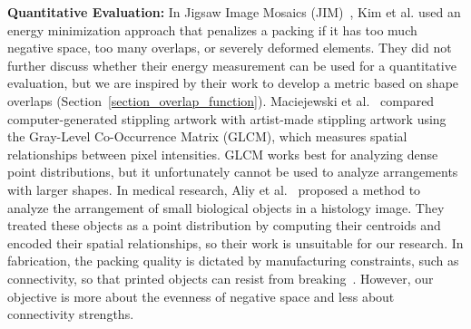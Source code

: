 \newtext
{
\textbf{Quantitative Evaluation:}
In Jigsaw Image Mosaics (JIM)~\cite{Kim2002}, Kim et al. used an energy minimization approach
that penalizes a packing if it has too much negative space,
too many overlaps, or severely deformed elements. 
They did not further discuss whether their energy measurement can be used for a quantitative evaluation,
but we are inspired by their work to develop a metric based on shape overlaps (Section~\ref{section_overlap_function}).
Maciejewski et al.~\cite{Maciejewski2008} compared computer-generated stippling artwork
with artist-made stippling artwork using the Gray-Level Co-Occurrence Matrix (GLCM),
which measures spatial relationships between pixel intensities.
GLCM works best for analyzing dense point distributions, but it unfortunately cannot be used to analyze arrangements with larger shapes.
In medical research, Aliy et al.~\cite{Aliy2013} proposed a method to analyze the arrangement of 
small biological objects in a histology image.
They treated these objects as a point distribution by computing their centroids and encoded their spatial relationships, 
so their work is unsuitable for our research.
In fabrication, the packing quality is dictated by manufacturing constraints, such as connectivity,
so that printed objects can resist from breaking~\cite{Chen2016, Zehnder2016, Martinez2019}.
However, our objective is more about the evenness of negative space and less about connectivity strengths.
}







